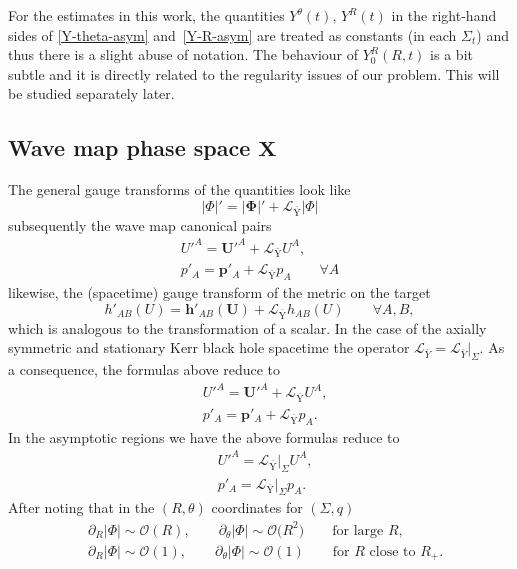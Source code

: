 \documentclass[11pt]{article}
\numberwithin{equation}{section}
\def\ptl{\partial}%
\def\mbo#1{\boldsymbol{#1}}%
\numberwithin{equation}{section}
\begin{document}
For the estimates in this work, the quantities $Y^\theta (t)$, $Y^R (t) $ in the right-hand sides of \eqref{Y-theta-asym} and~\eqref{Y-R-asym} are treated as constants (in each $\Sigma_t$) and thus there is a slight abuse of notation. The behaviour of $Y^R_0 (R, t)$ is a bit subtle and it is directly related to the regularity issues of our problem. This will be studied separately later.

\subsection*{Wave map phase space $\boldsymbol{X}$}
The general gauge transforms of the quantities
look like
\[
\vert \Phi \vert' = \vert \mbo{\Phi} \vert' + \mathcal{L}_{\bar{\text{Y}}}\vert \Phi \vert
\]
subsequently the wave map canonical pairs
\begin{gather*}
U'^A = \mbo{U}'^A + \mathcal{L}_{\bar{\text{Y}}} U^A, \\
p'_A = \mbo{p}'_A + \mathcal{L}_{\bar{\text{Y}}} p_A \qquad \forall A
\end{gather*}
likewise, the (spacetime) gauge transform of the metric on the target
\[
h'_{AB} (U)= \mbo{h}'_{AB} (\mbo{U}) + \mathcal{L}_{\bar{\text{Y}}} h_{AB}(U) \qquad \forall A, B,
\]
which is analogous to the transformation of a scalar.
In the case of the axially symmetric and stationary Kerr black hole spacetime the operator $\mathcal{L}_{\bar{Y}} = \mathcal{L}_{\bar{Y}} \vert_{\Sigma}$. As a consequence, the formulas above reduce to
\begin{align*}
& U'^A= \mbo{U}'^A +\mathcal{L}_{\bar{\text{Y}}} U^A, \\
& p'_A= \mbo{p}'_A + \mathcal{L}_{\bar{\text{Y}}} p_A.
 \end{align*}
In the asymptotic regions we have the above formulas reduce to
\begin{align*}
&U'^A= \mathcal{L}_{\bar{\text{Y}}}\vert_{\Sigma} U^A, \\
&p'_A= \mathcal{L}_{\bar{\text{Y}}}\vert_{\Sigma} p_A.
\end{align*}
After noting that in the $(R, \theta)$ coordinates for $(\Sigma, q)$
\begin{align*}
&\ptl_R \vert \Phi \vert \sim \mathcal{O}(R), \qquad \ptl_\theta \vert \Phi \vert \sim \mathcal{O}\bigl(R^2\bigr) \qquad \text{for large $R$} , \\
& \ptl_R \vert \Phi \vert \sim \mathcal{O}(1), \qquad \ptl_\theta \vert \Phi \vert \sim \mathcal{O}(1) \qquad \text{for $R$ close to $R_+$}.
\end{align*}
\end{document}

